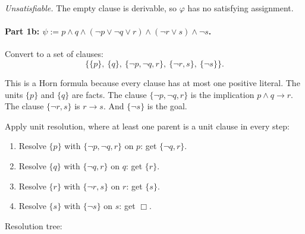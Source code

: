 \documentclass{article}
\theoremstyle{theorem}
\theoremstyle{definition}
\theoremstyle{remark}
\begin{document}
\emph{Unsatisfiable.} The empty clause is derivable, so $\varphi$ has no satisfying assignment.

\paragraph{Part 1b: $\psi := p \land q \land (\lnot p \lor \lnot q \lor r) \land (\lnot r \lor s) \land \lnot s$.}

Convert to a set of clauses:
\[
  \{\{p\},\ \{q\},\ \{\lnot p, \lnot q, r\},\ \{\lnot r, s\},\ \{\lnot s\}\}.
\]

This is a Horn formula because every clause has at most one positive literal. The units $\{p\}$ and $\{q\}$ are facts. The clause $\{\lnot p, \lnot q, r\}$ is the implication $p \land q \to r$. The clause $\{\lnot r, s\}$ is $r \to s$. And $\{\lnot s\}$ is the goal.

Apply unit resolution, where at least one parent is a unit clause in every step:
\begin{enumerate}
  \item Resolve $\{p\}$ with $\{\lnot p, \lnot q, r\}$ on $p$: get $\{\lnot q, r\}$.
  \item Resolve $\{q\}$ with $\{\lnot q, r\}$ on $q$: get $\{r\}$.
  \item Resolve $\{r\}$ with $\{\lnot r, s\}$ on $r$: get $\{s\}$.
  \item Resolve $\{s\}$ with $\{\lnot s\}$ on $s$: get $\Box$.
\end{enumerate}

Resolution tree:

\begin{center}
\end{center}
\end{document}
